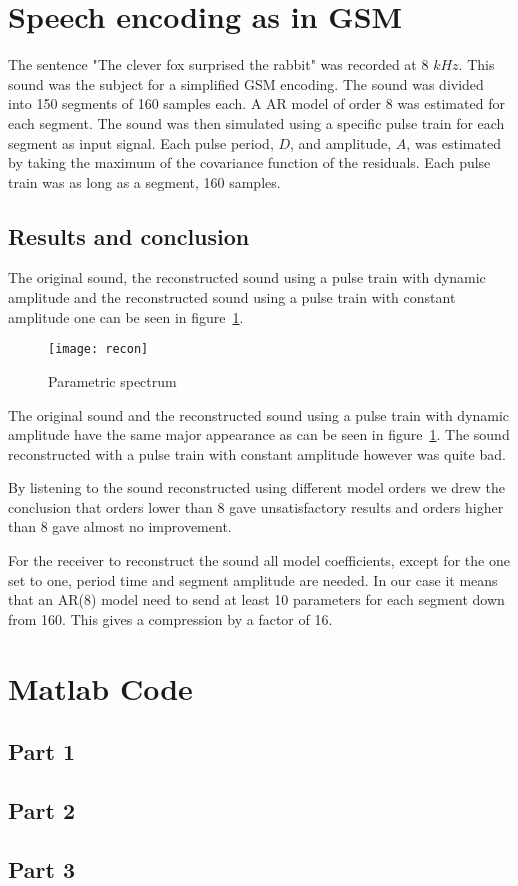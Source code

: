 \documentclass[10pt]{article}
\begin{document}
\section{Speech encoding as in GSM}
The sentence "The clever fox surprised the rabbit" was recorded at
8 $kHz$. This sound was the subject for a simplified GSM encoding.
The sound was divided into 150 segments of 160 samples each. A
AR model of order 8 was estimated for each segment. The sound was
then simulated using a specific pulse train for each segment as
input signal. Each pulse period, $D$, and amplitude, $A$, was
estimated by taking the maximum of the covariance function of the
residuals. Each pulse train was as long as a segment, 160 samples.


\subsection{Results and conclusion}
The original sound, the reconstructed sound using a pulse train with
dynamic amplitude and the reconstructed sound using a pulse train
with constant amplitude one can be seen in figure~\ref{fig:recon}.

\begin{figure}[!hp]

    \begin{center}
      \texttt{[image: recon]}
    \caption{Parametric spectrum \label{fig:recon}}
    \end{center}

\end{figure}

The original sound and the reconstructed sound using a pulse train
with dynamic amplitude have the same major appearance as can be seen in
figure~\ref{fig:recon}. The sound reconstructed with a pulse train with
constant amplitude however was quite bad.

By listening to the sound reconstructed using different model orders
we drew the conclusion that orders lower than $8$ gave unsatisfactory
results and orders higher than $8$ gave almost no improvement.

For the receiver to reconstruct the sound all model coefficients,
except for the one set to one, period time and segment amplitude are needed.
In our case it means that an AR(8) model need to send at least 10 parameters
for each segment down from 160. This gives a compression by a
factor of 16.

\newpage

\section*{Matlab Code}

\subsection*{Part 1}

\newpage
\subsection*{Part 2}

\newpage
\subsection*{Part 3}

\end{document}
